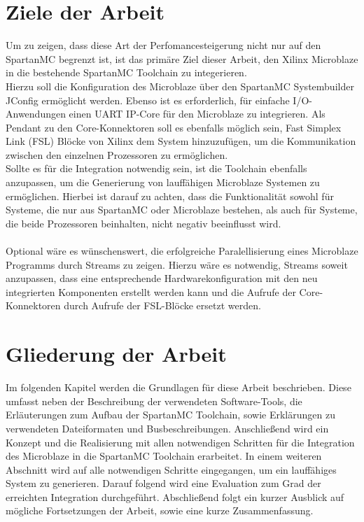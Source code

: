 \section{Ziele der Arbeit}
Um zu zeigen, dass diese Art der Perfomancesteigerung nicht nur auf den SpartanMC begrenzt ist, ist das primäre Ziel dieser Arbeit, den Xilinx Microblaze 
in die bestehende SpartanMC Toolchain zu integerieren.\\
Hierzu soll die Konfiguration des Microblaze über den SpartanMC Systembuilder JConfig ermöglicht werden. Ebenso ist es erforderlich, für einfache
I/O-Anwendungen einen UART IP-Core für den Microblaze zu integrieren. Als Pendant zu den Core-Konnektoren soll es ebenfalls möglich sein, Fast Simplex Link (FSL) Blöcke von Xilinx
dem System hinzuzufügen, um die Kommunikation zwischen den einzelnen Prozessoren zu ermöglichen.\\
Sollte es für die Integration notwendig sein, ist die Toolchain ebenfalls anzupassen, um die Generierung von lauffähigen Microblaze Systemen zu ermöglichen.
Hierbei ist darauf zu achten, dass die Funktionalität sowohl für Systeme, die nur aus SpartanMC oder Microblaze bestehen, als auch für Systeme, die beide Prozessoren beinhalten, 
nicht negativ beeinflusst wird.\\\\
Optional wäre es wünschenswert, die erfolgreiche Paralellisierung eines Microblaze Programms durch \textmu\/Streams zu zeigen. Hierzu wäre es notwendig, 
\textmu\/Streams soweit anzupassen, dass eine entsprechende Hardwarekonfiguration mit den neu integrierten Komponenten erstellt werden kann und
die Aufrufe der Core-Konnektoren durch Aufrufe der FSL-Blöcke ersetzt werden.
\section{Gliederung der Arbeit}
Im folgenden Kapitel werden die Grundlagen für diese Arbeit beschrieben. Diese umfasst neben der Beschreibung der verwendeten Software-Tools, die Erläuterungen zum
Aufbau der SpartanMC Toolchain, sowie Erklärungen zu verwendeten Dateiformaten und Busbeschreibungen. Anschließend wird ein Konzept und die Realisierung mit allen notwendigen Schritten 
für die Integration des Microblaze in die SpartanMC Toolchain erarbeitet. In einem weiteren 
Abschnitt wird auf alle notwendigen Schritte eingegangen, um ein lauffähiges System zu generieren. Darauf folgend wird eine Evaluation zum Grad der erreichten Integration
durchgeführt. Abschließend folgt ein kurzer Ausblick auf mögliche Fortsetzungen der Arbeit, sowie eine kurze Zusammenfassung.